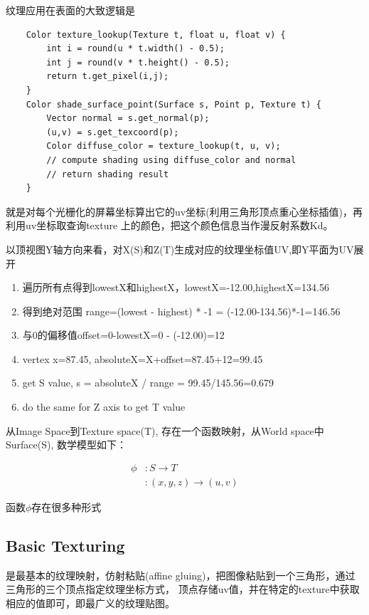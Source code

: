 纹理应用在表面的大致逻辑是
\begin{lstlisting}
    Color texture_lookup(Texture t, float u, float v) {
        int i = round(u * t.width() - 0.5);
        int j = round(v * t.height() - 0.5);
        return t.get_pixel(i,j);
    }
    Color shade_surface_point(Surface s, Point p, Texture t) {
        Vector normal = s.get_normal(p);
        (u,v) = s.get_texcoord(p);
        Color diffuse_color = texture_lookup(t, u, v);
        // compute shading using diffuse_color and normal 
        // return shading result    
    }
\end{lstlisting}
就是对每个光栅化的屏幕坐标算出它的uv坐标(利用三角形顶点重心坐标插值)，再利用uv坐标取查询texture
上的颜色，把这个颜色信息当作漫反射系数Kd。


以顶视图Y轴方向来看，对X(S)和Z(T)生成对应的纹理坐标值UV,即Y平面为UV展开

\begin{enumerate}
    \item \textsf{遍历所有点得到lowestX和highestX，lowestX=-12.00,highestX=134.56}
    \item \textsf{得到绝对范围 range=(lowest - highest) * -1 = (-12.00-134.56)*-1=146.56}
    \item \textsf{与0的偏移值offset=0-lowestX=0 - (-12.00)=12}
    \item \textsf{vertex x=87.45, absoluteX=X+offset=87.45+12=99.45}
    \item \textsf{get S value, s = absoluteX / range = 99.45/145.56=0.679}
    \item \textsf{do the same for Z axis to get T value}
\end{enumerate}

从Image Space到Texture space(T), 存在一个函数映射，从World space中Surface(S), 数学模型如下：

\begin{align*}
    \phi &: S \rightarrow T \\
    &: (x,y,z) \rightarrow (u,v)
\end{align*}

函数$\phi$存在很多种形式

\subsection{Basic Texturing}

是最基本的纹理映射，仿射粘贴(affine gluing)，把图像粘贴到一个三角形，通过三角形的三个顶点指定纹理坐标方式，
顶点存储uv值，并在特定的texture中获取相应的值即可，即最广义的纹理贴图。

